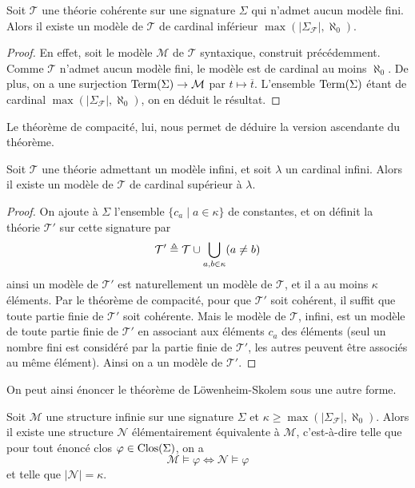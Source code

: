 \begin{theorem}
  Soit $\mathcal T$ une théorie cohérente sur une signature $\Sigma$ qui
  n'admet aucun modèle fini. Alors il existe un modèle de $\mathcal T$ de
  cardinal inférieur $\max(|\Sigma_{\mathcal F}|,\aleph_0)$.
\end{theorem}

\begin{proof}
  En effet, soit le modèle $\mathcal M$ de $\mathcal T$ syntaxique, construit
  précédemment. Comme $\mathcal T$ n'admet aucun modèle fini, le modèle est de
  cardinal au moins $\aleph_0$. De plus, on a une surjection
  $\operatorname{Term}(\Sigma) \to \mathcal M$ par $t\mapsto \overline t$. L'ensemble
  $\operatorname{Term}(\Sigma)$ étant de cardinal $\max(|\Sigma_{\mathcal F}|,\aleph_0)$, on
  en déduit le résultat.
\end{proof}

Le théorème de compacité, lui, nous permet de déduire la version ascendante du
théorème.

\begin{theorem}
  Soit $\mathcal T$ une théorie admettant un modèle infini, et
  soit $\lambda$ un cardinal infini. Alors il existe un modèle
  de $\mathcal T$ de cardinal supérieur à $\lambda$.
\end{theorem}

\begin{proof}
  On ajoute à $\Sigma$ l'ensemble $\{c_a\mid a \in \kappa\}$ de constantes, et
  on définit la théorie $\mathcal T'$ sur cette signature par
  \[\mathcal T'\triangleq\mathcal T\cup \bigcup_{a,b\in \kappa}(a\neq b)\]
  ainsi un modèle de $\mathcal T'$ est naturellement un modèle de $\mathcal T$,
  et il a au moins $\kappa$ éléments. Par le théorème de compacité, pour
  que $\mathcal T'$ soit cohérent, il suffit que toute partie finie de
  $\mathcal T'$ soit cohérente. Mais le modèle de $\mathcal T$, infini, est
  un modèle de toute partie finie de $\mathcal T'$ en associant aux éléments
  $c_a$ des éléments (seul un nombre fini est considéré par la partie finie de
  $\mathcal T'$, les autres peuvent être associés au même élément). Ainsi on
  a un modèle de $\mathcal T'$.
\end{proof}

On peut ainsi énoncer le théorème de Löwenheim-Skolem sous une autre forme.

\begin{theorem}
  Soit $\mathcal M$ une structure infinie sur une signature $\Sigma$ et
  $\kappa \geq \max(|\Sigma_{\mathcal F}|,\aleph_0)$. Alors il existe une
  structure $\mathcal N$ élémentairement équivalente à $\mathcal M$,
  c'est-à-dire telle que pour tout énoncé clos $\varphi\in\operatorname{Clos}(\Sigma)$, on a
  \[\mathcal M \models \varphi \iff \mathcal N \models \varphi\]
  et telle que $|\mathcal N| = \kappa$.
\end{theorem}

